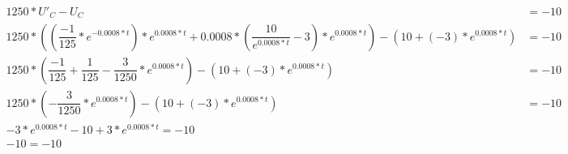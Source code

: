 \begin{align*}
	1250 * U'_C - U_C &= -10 \\
	1250 * ((\dfrac{-1}{125} * e^{-0.0008 * t} ) * e^{0.0008 * t} + 0.0008 * (\dfrac{10}{e^{0.0008 * t}} - 3) * e^{0.0008 * t}) - (10 + (-3) * e^{0.0008 * t}) &= -10 \\ 
	1250 * (\dfrac{-1}{125} + \dfrac{1}{125} - \dfrac{3}{1250} * e^{0.0008 * t}) - (10 + (-3) * e^{0.0008 * t}) &= -10 \\ 
	1250 * (- \dfrac{3}{1250} * e^{0.0008 * t}) - (10 + (-3) * e^{0.0008 * t}) &= -10 \\
	-3*e^{0.0008 * t} - 10 + 3*e^{0.0008 * t}   = -10 \\
	-10 = -10
\end{align*}